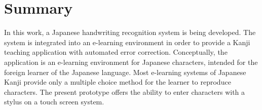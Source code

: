 
\chapter*{Summary}
\label{chap:summary}
\pagestyle{empty}


  



    



In this work, a Japanese handwriting recognition system is being developed.
The system is integrated into an e-learning environment in order to provide 
a Kanji teaching application with automated error correction.
Conceptually, the application is an e-learning environment for Japanese 
characters, intended for the foreign learner of the Japanese language. 
Most e-learning systems of Japanese Kanji provide only a multiple choice method
for the learner to reproduce characters. The present prototype offers the
ability to enter characters with a stylus on a touch screen system.

